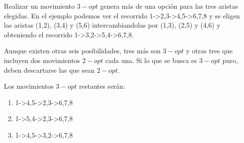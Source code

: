 \begin{figure}[h] 
 \centering
       \label{fig:Movimiento 3-opt1}
    \label{fig:Movimiento 3opt}
\end{figure}

Realizar un movimiento $3-opt$ genera más de una opción para las tres aristas elegidas.
En el ejemplo podemos ver el recorrido 1->2,3->4,5->6,7,8 y se eligen las aristas (1,2), (3,4) y (5,6) intercambiandolas por (1,3), (2,5) y (4,6) y obteniendo el recorrido 1->3,2->5,4->6,7,8.

Aunque existen otras seis posibilidades, tres más son $3-opt$ y otras tres que incluyen dos movimientos $2-opt$ cada una. Si lo que se busca es $3-opt$ puro, deben descartarse las que sean $2-opt$.

Los movimientos $3-opt$ restantes serán:

\begin{enumerate}
\item 1->4,5->2,3->6,7,8
\item 1->5,4->2,3->6,7,8
\item 1->4,5->3,2->6,7,8
\end{enumerate}

